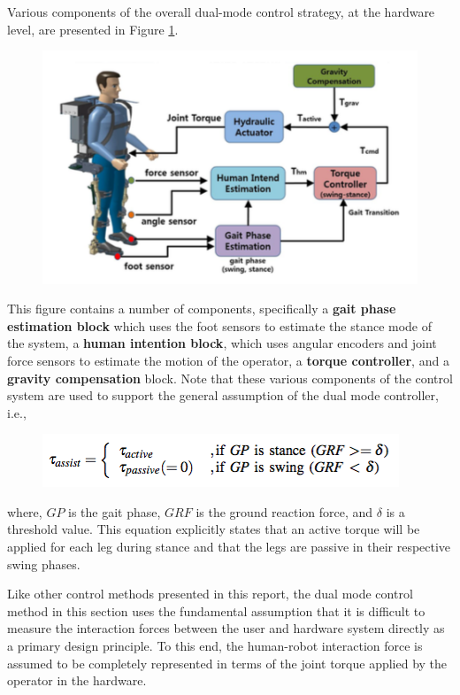 Various components of the overall dual-mode control strategy, at the hardware level, are presented in Figure \ref{fig:suitDia}.  
  \begin{figure}[thpb]
\centering
\includegraphics[width=3.in]{exos/figs/hydLowerExrem/suitDia}
  \caption{}
  \vspace{-0.2in}
 \label{fig:suitDia}   
 \end{figure}
This figure contains a number of components, specifically a {\bf gait phase estimation block} which uses the foot sensors to estimate the stance mode of the system, a {\bf human intention block}, which uses angular encoders and joint force sensors to estimate the motion of the operator, a {\bf torque controller}, and a {\bf gravity compensation} block.  Note that these various components of the control system are used to support the general assumption of the dual mode controller, i.e., 
 \begin{figure}[thpb]
\centering
\includegraphics[width=3.in]{exos/figs/hydLowerExrem/torAssist}
  \caption{}
  \vspace{-0.2in}
 \end{figure}
 
 \noindent
where, $GP$ is the gait phase, $GRF$ is the ground reaction force, and $\delta$ is a threshold value.  This equation explicitly states that an active torque will be applied for each leg during stance and that the legs are passive in their respective swing phases.

Like other control methods presented in this report, the dual mode control method in this section uses the fundamental assumption that it is difficult to measure the interaction forces between the user and hardware system directly as a primary design principle.  To this end, the human-robot interaction force is assumed to be completely represented in terms of the joint torque applied by the operator in the hardware. 


